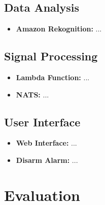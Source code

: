 \documentclass[conference]{IEEEtran}
\begin{document}
\subsection{Data Analysis}
\begin{itemize}
    \item \textbf{Amazon Rekognition:} ...
\end{itemize}
\subsection{Signal Processing}  
\begin{itemize}
    \item \textbf{Lambda Function:} ...
    \item \textbf{NATS:} ...
\end{itemize}
\subsection{User Interface}
\begin{itemize}
    \item \textbf{Web Interface:} ...
    \item \textbf{Disarm Alarm:} ...
\end{itemize}

\section{Evaluation}
\end{document}
